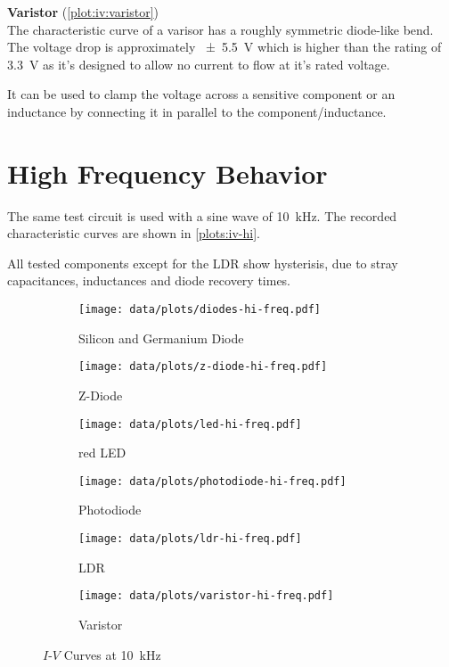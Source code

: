 \textbf{Varistor} (\autoref{plot:iv:varistor})\\
The characteristic curve of a varisor has a roughly symmetric diode-like bend.
The voltage drop is approximately \SI{\pm 5.5}{\volt} which is higher than the rating of \SI{3.3}{\volt} as it's designed to allow no current to flow at it's rated voltage.

It can be used to clamp the voltage across a sensitive component or an inductance by connecting it in parallel to the component/inductance.

\section{High Frequency Behavior}

The same test circuit is used with a sine wave of \SI{10}{\kHz}.
The recorded characteristic curves are shown in \autoref{plots:iv-hi}.

All tested components except for the LDR show hysterisis, due to stray capacitances, inductances and diode recovery times.

\begin{figure}[tbp]
	\centering

	\begin{subfigure}{\ivsubfigwidth}
		\centering
		\texttt{[image: data/plots/diodes-hi-freq.pdf]}
		\caption{Silicon and Germanium Diode}
		\label{plot:iv-hi:si-ge-diode}
	\end{subfigure}
	\begin{subfigure}{\ivsubfigwidth}
		\centering
		\texttt{[image: data/plots/z-diode-hi-freq.pdf]}
		\caption{Z-Diode}
		\label{plot:iv-hi:z-diode}
	\end{subfigure}

	\begin{subfigure}{\ivsubfigwidth}
		\centering
		\texttt{[image: data/plots/led-hi-freq.pdf]}
		\caption{red LED}
		\label{plot:iv-hi:leds}
	\end{subfigure}
	\begin{subfigure}{\ivsubfigwidth}
		\centering
		\texttt{[image: data/plots/photodiode-hi-freq.pdf]}
		\caption{Photodiode}
		\label{plot:iv-hi:photodiode}
	\end{subfigure}

	\begin{subfigure}{\ivsubfigwidth}
		\centering
		\texttt{[image: data/plots/ldr-hi-freq.pdf]}
		\caption{LDR}
		\label{plot:iv-hi:ldr}
	\end{subfigure}
	\begin{subfigure}{\ivsubfigwidth}
		\centering
		\texttt{[image: data/plots/varistor-hi-freq.pdf]}
		\caption{Varistor}
		\label{plot:iv-hi:varistor}
	\end{subfigure}

	\caption{$I$-$V$ Curves at \SI{10}{\kHz}}
	\label{plots:iv-hi}
\end{figure}
